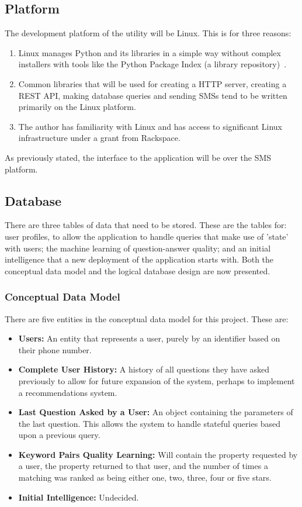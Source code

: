 \documentclass[authoryearcitations]{UoYCSproject}
\begin{document}
\subsection{Platform}
The development platform of the utility will be Linux.  This is for three reasons:
\begin{enumerate}
  \item Linux manages Python and its libraries in a simple way without complex installers with tools like the Python Package Index (a library repository)~\cite{pypi}.
  \item Common libraries that will be used for creating a HTTP server, creating a REST API, making database queries and sending SMSs tend to be written primarily on the Linux platform.
  \item The author has familiarity with Linux and has access to significant Linux infrastructure under a grant from Rackspace.
\end{enumerate}

As previously stated, the interface to the application will be over the SMS platform.

\subsection{Database}
There are three tables of data that need to be stored.  These are the tables for: user profiles, to allow the application to handle queries that make use of 'state' with users; the machine learning of question-answer quality; and an initial intelligence that a new deployment of the application starts with.  Both the conceptual data model and the logical database design are now presented.

\subsubsection{Conceptual Data Model}
There are five entities in the conceptual data model for this project.  These are:

\begin{itemize}
  \item {\bf Users:} An entity that represents a user, purely by an identifier based on their phone number.
  \item {\bf Complete User History:} A history of all questions they have asked previously to allow for future expansion of the system, perhaps to implement a recommendations system.
  \item {\bf Last Question Asked by a User:} An object containing the parameters of the last question.  This allows the system to handle stateful queries based upon a previous query.
  \item {\bf Keyword Pairs Quality Learning:} Will contain the property requested by a user, the property returned to that user, and the number of times a matching was ranked as being either one, two, three, four or five stars.
  \item {\bf Initial Intelligence:} \color{red} Undecided.
\end{itemize}
\end{document}
